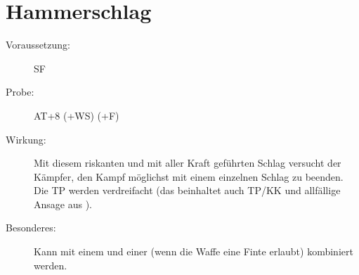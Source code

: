 \section{Hammerschlag}
\label{bAT.hammerschlag}
\begin{description}
    \item[Voraussetzung:]
        SF 
    \item[Probe:]
        AT+8 (+WS) (+F)
    \item[Wirkung:]
        Mit diesem riskanten und mit aller Kraft geführten Schlag versucht der Kämpfer, den Kampf möglichst mit einem einzelnen Schlag zu beenden.
        Die TP werden verdreifacht (das beinhaltet auch TP/KK und allfällige Ansage aus ).
    \item[Besonderes:]
        Kann mit einem  und einer  (wenn die Waffe eine Finte erlaubt) kombiniert werden.
\end{description}
